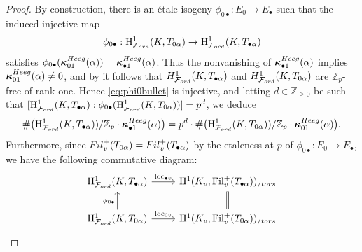 \documentclass[10pt,reqno]{amsart}
\numberwithin{equation}{section}
\theoremstyle{plain}
\theoremstyle{definition}
\theoremstyle{definition}
\theoremstyle{plain}
\theoremstyle{plain}
\theoremstyle{plain}
\theoremstyle{plain}
\theoremstyle{plain}
\theoremstyle{plain}
\newcommand{\ind}{\operatorname{ind}}
\newcommand{\Fil}{\mathrm{Fil}}
\newcommand{\Z}{\mathbb{Z}}
\newcommand{\Zp}{\mathbb{Z}_{p}}
\newcommand{\bkappa}{\boldsymbol{\kappa}}
\DeclareMathOperator{\loc}{loc}
\newcommand{\Fcal}{\mathcal{F}}
\newcommand{\rH}{\mathrm{H}}
\begin{document}
\begin{proof}
%
By construction, there is an \'etale isogeny $\phi_{0\bullet}: E_0 \to E_\bullet$ such that the induced injective map
\begin{equation}\label{eq:phi0bullet}
\phi_{0\bullet}: \rH^1_{\Fcal_{\rm ord}}(K,T_{0\alpha})\to   \rH^1_{\Fcal_{\rm ord}}(K,T_{\bullet\alpha})
\end{equation}
satisfies $\phi_{0\bullet}(\bkappa_{0 1}^{\rm Heeg}(\alpha))=\bkappa^{\rm Heeg}_{\bullet 1}(\alpha)$. Thus the nonvanishing of $\bkappa^{\rm Heeg}_{\bullet 1}(\alpha)$ implies 
$\bkappa_{0 1}^{\rm Heeg}(\alpha)\neq 0$, and by \cite[Thm.~6.1.1]{eisenstein_cyc} it follows that ${\rm H}^1_{\Fcal_{\rm ord}}(K,T_{\bullet\alpha})$ and ${\rm H}^1_{\Fcal_{\rm ord}}(K,T_{0\alpha})$ are $\Z_p$-free of rank one. Hence \eqref{eq:phi0bullet} is injective, and letting $d\in\Z_{\geq 0}$ be such that $[\rH^1_{\Fcal_{\rm ord}}(K,T_{\bullet\alpha}): \phi_{0\bullet}(\rH^1_{\Fcal_{\rm ord}}(K,T_{0\alpha}))]=p^d$, we deduce
\begin{equation}\label{eq:indexfE}
\#\bigl(\rH^1_{\Fcal_{\rm ord}}(K,T_{\bullet\alpha}))/\Zp\cdot \bkappa_{\bullet 1}^{\rm Heeg}(\alpha)\bigr) = p^d\cdot \#\bigl(\rH^1_{\Fcal_{\rm ord}}(K,T_{0\alpha}))/\Zp\cdot \bkappa_{01}^{\rm Heeg}(\alpha)\bigr).
\end{equation}
Furthermore, since ${\rm Fil}_v^+(T_{0\alpha})={\rm Fil}_v^+(T_{\bullet\alpha})$ by the etaleness at $p$ of $\phi_{0\bullet}:E_0\rightarrow E_\bullet$, we have the following commutative diagram:
\[
\begin{tikzcd}
\rH^1_{\Fcal_{\rm ord}}(K,T_{\bullet\alpha}) \arrow{r}{\loc_{\bullet v}} &\rH^1(K_v, \Fil_v^+(T_{\bullet\alpha}))_{/ \rm tors} \\
\rH^1_{\Fcal_{\rm ord}}(K,T_{0\alpha}) \arrow{u}{\phi_{0\bullet}}\arrow{r}{\loc_{0 v}} & \rH^1(K_v,\Fil_v^+(T_{0\alpha}))_{/ \rm tors} \arrow[equal]{u}
\end{tikzcd}
\]

\end{proof}
\end{document}
